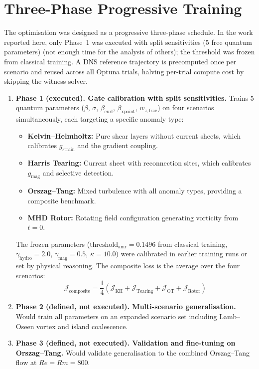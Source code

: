 \documentclass[12pt, a4paper, oneside]{report}
\begin{document}
\section{Three-Phase Progressive Training}
\label{sec:multi-scenario-training}
The optimisation was designed as a progressive three-phase schedule. In the work reported here, only Phase~1 was executed with split sensitivities (5 free quantum parameters) (not enough time for the analysis of others); the threshold was frozen from classical training. A DNS reference trajectory is precomputed once per scenario and reused across all Optuna trials, halving per-trial compute cost by skipping the witness solver.

\begin{enumerate}
    \item \textbf{Phase 1 (executed). Gate calibration with split sensitivities.} Trains 5 quantum parameters ($\beta$, $\sigma$, $\beta_{\text{curl}}$, $\beta_{\text{xpoint}}$, $w_{z,\text{frac}}$) on four scenarios simultaneously, each targeting a specific anomaly type:
    \begin{itemize}
        \item \textbf{Kelvin--Helmholtz:} Pure shear layers without current sheets, which calibrates $g_{\text{strain}}$ and the gradient coupling.
        \item \textbf{Harris Tearing:} Current sheet with reconnection sites, which calibrates $g_{\text{mag}}$ and selective detection.
        \item \textbf{Orszag--Tang:} Mixed turbulence with all anomaly types, providing a composite benchmark.
        \item \textbf{MHD Rotor:} Rotating field configuration generating vorticity from $t = 0$.
    \end{itemize}
    The frozen parameters ($\text{threshold}_{\text{amr}} = 0.1496$ from classical training, $\gamma_{\text{hydro}} = 2.0$, $\gamma_{\text{mag}} = 0.5$, $\kappa = 10.0$) were calibrated in earlier training runs or set by physical reasoning. The composite loss is the average over the four scenarios:
    \begin{equation}
        \mathcal{J}_{\text{composite}} = \frac{1}{4}\left(\mathcal{J}_{\text{KH}} + \mathcal{J}_{\text{Tearing}} + \mathcal{J}_{\text{OT}} + \mathcal{J}_{\text{Rotor}}\right)
    \end{equation}

    \item \textbf{Phase 2 (defined, not executed). Multi-scenario generalisation.} Would train all parameters on an expanded scenario set including Lamb--Oseen vortex and island coalescence.

    \item \textbf{Phase 3 (defined, not executed). Validation and fine-tuning on Orszag--Tang.} Would validate generalisation to the combined Orszag--Tang flow at $Re = Rm = 800$.
\end{enumerate}
\end{document}
